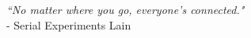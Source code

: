\thispagestyle{plain}

{
\raggedleft
\textit{“No matter where you go, everyone's connected."}
\\ - Serial Experiments Lain

}
